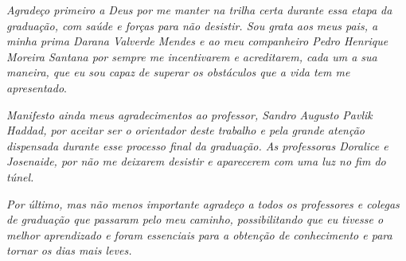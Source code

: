 \begin{agradecimentos}
 
\textit{Agradeço primeiro a Deus por me manter na trilha certa durante essa etapa da graduação, com saúde e forças para não desistir. Sou grata aos meus pais, a minha prima Darana Valverde Mendes e ao meu companheiro Pedro Henrique Moreira Santana por sempre me incentivarem e acreditarem, cada um a sua maneira, que eu sou capaz de superar os obstáculos que a vida tem me apresentado}.

\textit{Manifesto ainda meus agradecimentos ao professor, Sandro Augusto Pavlik Haddad, por aceitar ser o orientador deste trabalho e pela grande atenção dispensada durante esse processo final da graduação. As professoras Doralice e Josenaide, por não me deixarem desistir e aparecerem com uma luz no fim do túnel.}

\textit{Por último, mas não menos importante agradeço a todos os professores e colegas de graduação que passaram pelo meu caminho, possibilitando que eu tivesse o melhor aprendizado e foram essenciais para a obtenção de conhecimento e para tornar os dias mais leves.}

\end{agradecimentos}
